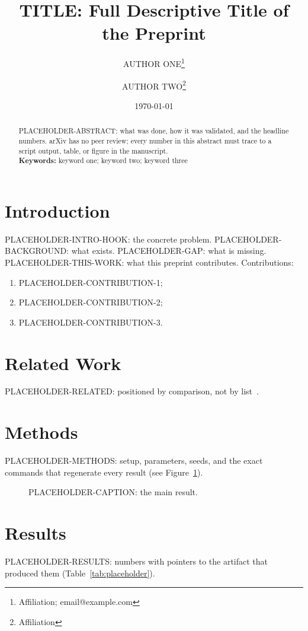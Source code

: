 \documentclass[11pt]{article}
\title{TITLE: Full Descriptive Title of the Preprint}
\author{AUTHOR ONE\thanks{Affiliation; email@example.com} \and AUTHOR TWO\thanks{Affiliation}}
\date{\today}
\begin{document}
\maketitle

\begin{abstract}
\noindent PLACEHOLDER-ABSTRACT: what was done, how it was validated, and the headline
numbers. arXiv has no peer review; every number in this abstract must trace to a
script output, table, or figure in the manuscript.
\\[2mm]
\textbf{Keywords:} keyword one; keyword two; keyword three
\end{abstract}

\section{Introduction}
PLACEHOLDER-INTRO-HOOK: the concrete problem. PLACEHOLDER-BACKGROUND: what exists.
PLACEHOLDER-GAP: what is missing. PLACEHOLDER-THIS-WORK: what this preprint contributes.
Contributions:
\begin{enumerate}
\item PLACEHOLDER-CONTRIBUTION-1;
\item PLACEHOLDER-CONTRIBUTION-2;
\item PLACEHOLDER-CONTRIBUTION-3.
\end{enumerate}

\section{Related Work}
PLACEHOLDER-RELATED: positioned by comparison, not by list~\citep{keyref1}.

\section{Methods}
PLACEHOLDER-METHODS: setup, parameters, seeds, and the exact commands that
regenerate every result (see Figure~\ref{fig:placeholder}).

\begin{figure}[t]
\centering
\caption{PLACEHOLDER-CAPTION: the main result.}
\label{fig:placeholder}
\end{figure}

\section{Results}
PLACEHOLDER-RESULTS: numbers with pointers to the artifact that produced them
(Table~\ref{tab:placeholder}).
\end{document}

